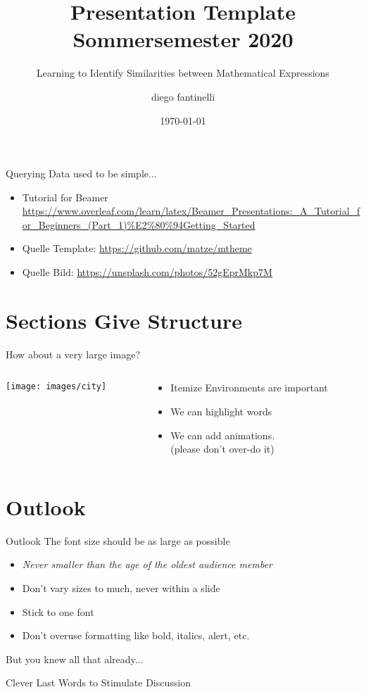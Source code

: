 \documentclass[aspectratio=169,10pt]{beamer}
\title{Presentation Template Sommersemester 2020}
\subtitle{Learning to Identify Similarities between Mathematical Expressions}
\author{diego fantinelli}
\institute{TU Dortmund University - Dipartmento di Matematica}
\date{\today}
\begin{document}
\maketitle

\begin{frame}[t,fragile]{Querying Data used to be simple...}
  \begin{itemize}
      \item Tutorial for Beamer \url{https://www.overleaf.com/learn/latex/Beamer_Presentations:_A_Tutorial_for_Beginners_(Part_1)%E2%80%94Getting_Started}
      \item Quelle Template: \url{https://github.com/matze/mtheme}
      \item Quelle Bild: \url{https://unsplash.com/photos/52gEprMkp7M}
  \end{itemize}
\end{frame}

\section{Sections Give Structure}

\begin{frame}[fragile]{How about a very large image?}

\begin{columns}
    \begin{column}{0.57\paperwidth}
        \vspace{0.5pt}
        \texttt{[image: images/city]}
    \end{column}
    \begin{column}[c]{0.43\paperwidth}
        \begin{itemize}
        \item Itemize Environments are important
        \item We can \alert{highlight} words
        \pause
        \item We can add animations.\\(please don't over-do it)
        \end{itemize}
    \end{column}
\end{columns}
\end{frame}

\section{Outlook}
\begin{frame}{Outlook}
\Large
The font size should be as large as possible
\begin{itemize}
\item \textit{Never smaller than the age of the oldest audience member}
\item Don't vary sizes to much, never within a slide
\item Stick to one font
\item Don't overuse formatting like bold, italics, alert, etc.
\end{itemize}
But you knew all that already...
\end{frame}

\begin{frame}[t,standout]
\Large
Clever Last Words to Stimulate Discussion
\end{frame}
\end{document}
